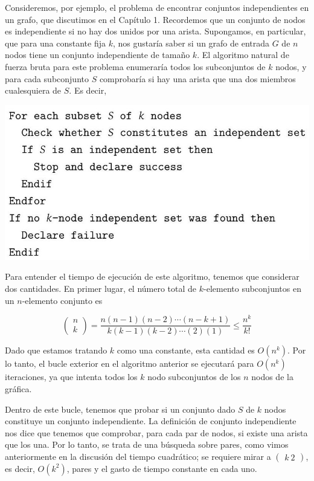 \documentclass[a4paper, 12pt]{book}
\theoremstyle{dotless}
\begin{document}
Consideremos, por ejemplo, el problema de encontrar conjuntos independientes en un grafo, que discutimos en el Capítulo 1. Recordemos que un conjunto de nodos es independiente si no hay dos unidos por una arista. Supongamos, en particular, que para una constante fija $k$, nos gustaría saber si un grafo de entrada $G$ de $n$ nodos tiene un conjunto independiente de tamaño $k$. El algoritmo natural de fuerza bruta para este problema enumeraría todos los subconjuntos de $k$ nodos, y para cada subconjunto $S$ comprobaría si hay una arista que una dos miembros cualesquiera de $S$. Es decir,

\begin{center}
\includegraphics[width=\textwidth]{./Imagenes-Seccion2/2023_08_07_379b6f7f3185549667e3g-07(1)}
\end{center}

Para entender el tiempo de ejecución de este algoritmo, tenemos que considerar dos cantidades. En primer lugar, el número total de $k$-elemento subconjuntos en un $n$-elemento conjunto es

$$
\left(\begin{array}{l}
n \\
k
\end{array}\right)=\frac{n(n-1)(n-2) \cdots(n-k+1)}{k(k-1)(k-2) \cdots(2)(1)} \leq \frac{n^{k}}{k !}
$$

Dado que estamos tratando $k$ como una constante, esta cantidad es $O\left(n^{k}\right)$. Por lo tanto, el bucle exterior en el algoritmo anterior se ejecutará para $ O\left(n^{k}\right)$ iteraciones, ya que intenta todos los $k$ nodo subconjuntos de los $n$ nodos de la gráfica.

Dentro de este bucle, tenemos que probar si un conjunto dado $S$ de $k$ nodos constituye un conjunto independiente. La definición de conjunto independiente nos dice que tenemos que comprobar, para cada par de nodos, si existe una arista que los una. Por lo tanto, se trata de una búsqueda sobre pares, como vimos anteriormente en la discusión del tiempo cuadrático; se requiere mirar a $\left(\begin{array}{l}k \ 2\end{array}\right)$, es decir, $O\left(k^{2}\right)$, pares y el gasto de tiempo constante en cada uno.
\end{document}
